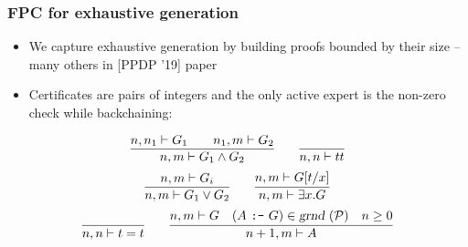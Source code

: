 \documentclass{beamer}
\newcommand{\red}[1]{{\color{red} #1}}
\newcommand{\trueExpert }[1]{{\true_e}(#1)}
\newcommand{\eqExpert }[1]{{=_e}(#1)}
\newcommand{\andExpert}[3]{{\wedge_e}(#1,#2,#3)}
\newcommand{\orExpert  }[3]{{\vee_e}(#1,#2,#3)}
\newcommand{\someExpert}[3]{\exists_e(#1,#2,#3)}
\newcommand{\true}{tt}
\newcommand{\XXi}{{\color{blue}{\Xi}}}
\begin{document}
\begin{frame}
  \frametitle{FPC for exhaustive generation}
  \begin{itemize}
  \item We capture exhaustive generation by building proofs bounded by their 
    size -- many others in [PPDP '19] paper
  \pause
  \item Certificates are pairs of integers and the only active expert
    is the non-zero check while backchaining: 

 \end{itemize}
 \pause
 \[
\infer{n,m\vdash G_1\wedge G_2}
{n,n_1\vdash G_1\qquad n_1,m\vdash G_2 %
}
\qquad
\infer{n,n\vdash \true}
{
}
\]
\vskip -6pt
\[
\infer{n,m\vdash G_1\vee G_2}
{n,m\vdash G_i%
}
\qquad
\infer{n,m\vdash \exists x. G}
{n,m\vdash G[t/x]%
}
\]
\vskip -6pt
\[
\infer{n,n\vdash t = t}
{
}
\qquad
\infer{n + 1,m\vdash A}
      {n,m\vdash G \quad (A~\hbox{\tt :-}~G)\in\instan\Pscr
                     \quad n \geq 0}
\]

\end{frame}



\end{document}
